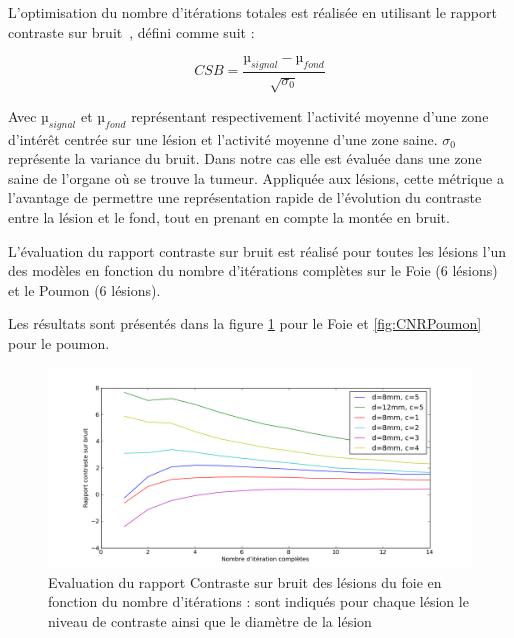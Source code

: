 L'optimisation du nombre d'itérations totales est réalisée en utilisant le rapport contraste sur bruit~\cite{takahara2004diffusion}, défini comme suit :

\begin{equation}
 CSB = \frac{µ_{signal} - µ_{fond}}{\sqrt{\sigma_0}}
\end{equation}

Avec $µ_{signal}$ et $µ_{fond}$ représentant respectivement l'activité moyenne d'une zone d'intérêt centrée sur une lésion et l'activité moyenne d'une zone saine. $\sigma_0$ représente la variance du bruit. Dans notre cas elle est évaluée dans une zone saine de l'organe où se trouve la tumeur. Appliquée aux lésions, cette métrique a l'avantage de permettre une représentation rapide de l'évolution du contraste entre la lésion et le fond, tout en prenant en compte la montée en bruit.

L'évaluation du rapport contraste sur bruit est réalisé pour toutes les lésions l'un des modèles en fonction du nombre d'itérations complètes sur le Foie (6 lésions) et le Poumon (6 lésions).

Les résultats sont présentés dans la figure \ref{fig:CNRFoie} pour le Foie et \ref{fig:CNRPoumon} pour le poumon.

\begin{figure}
\centering
\includegraphics[width=17cm]{images/CNRFoie}
\caption[Evaluation du rapport Contraste sur bruit des lésions du foie en fonction du nombre d'itérations]{Evaluation du rapport Contraste sur bruit des lésions du foie en fonction du nombre d'itérations : sont indiqués pour chaque lésion le niveau de contraste ainsi que le diamètre de la lésion}
\label{fig:CNRFoie}
\end{figure}


